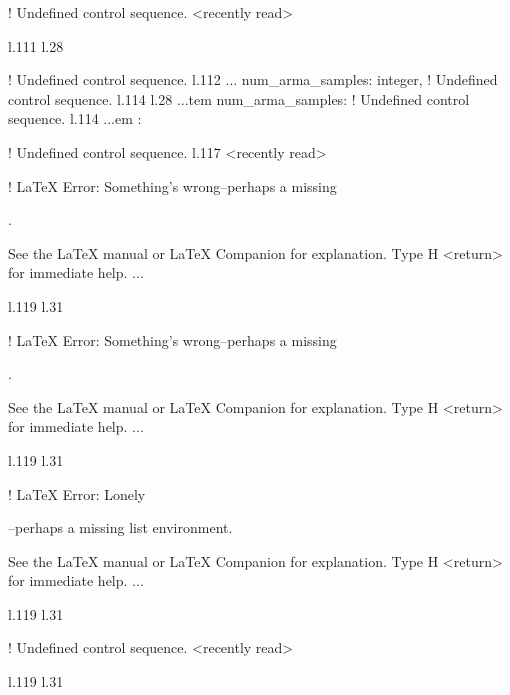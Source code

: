 {{{{{{! Undefined control sequence.
<recently read> \xmlNode 
                         
l.111 l.28     \item \xmlNode
                             
! Undefined control sequence.
l.112 ...           {num\_arma\_samples}: \xmlDesc
                                                  {integer},
! Undefined control sequence.
l.114 l.28 ...tem \xmlNode
                          {num\_arma\_samples}: \xmlDesc
! Undefined control sequence.
l.114 ...em : \xmlDesc
                                                  
! Undefined control sequence.
l.117 <recently read> \xmlNode
                              

! LaTeX Error: Something's wrong--perhaps a missing \item.

See the LaTeX manual or LaTeX Companion for explanation.
Type  H <return>  for immediate help.
 ...                                              
                                                  
l.119 l.31     \item \xmlNode
                             

! LaTeX Error: Something's wrong--perhaps a missing \item.

See the LaTeX manual or LaTeX Companion for explanation.
Type  H <return>  for immediate help.
 ...                                              
                                                  
l.119 l.31     \item \xmlNode
                             

! LaTeX Error: Lonely \item--perhaps a missing list environment.

See the LaTeX manual or LaTeX Companion for explanation.
Type  H <return>  for immediate help.
 ...                                              
                                                  
l.119 l.31     \item \xmlNode
                             
! Undefined control sequence.
<recently read> \xmlNode 
                         
l.119 l.31     \item \xmlNode
                             
}}}}}}
